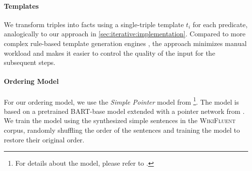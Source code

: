 \paragraph{Templates}
We transform triples into facts using a single-triple template $t_i$ for each predicate, analogically to our approach in \autoref{sec:iterative:implementation}. Compared to more complex rule-based template generation engines \cite{laha2020scalable,heidari2021getting,mehta2021improving}, the approach minimizes manual workload and makes it easier to control the quality of the input for the subsequent steps.

\paragraph{Ordering Model}
For our ordering model, we use the \emph{Simple Pointer} model from \citet{calizzano2021ordering}\footnote{For details about the model, please refer to \citet{calizzano2021ordering}.}. The model is based on a pretrained BART-base model \cite{lewisBARTDenoisingSequencetoSequence2019} extended with a pointer network from \citet{wang2019hierarchical}. We train the model using the synthesized simple sentences in the \textsc{WikiFluent} corpus, randomly shuffling the order of the sentences and training the model to restore their original order.






